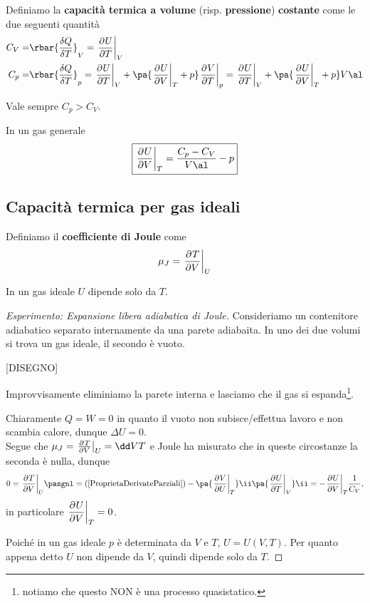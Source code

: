 \begin{definition}
Definiamo la \textbf{capacit\`a termica a volume} (risp. \textbf{pressione}) \textbf{costante} come le due seguenti quantit\`a
\begin{align*}
C_V=&\rbar{\frac{\delta Q}{\delta T}}_V=\ppb TUV\\
C_p=&\rbar{\frac{\delta Q}{\delta T}}_p=\ppb TUV +\pa{\ppb VUT+p}\ppb TVp=\ppb TUV +\pa{\ppb VUT+p}V\al
\end{align*} 
\end{definition}

\begin{remark}\label{DisguguaglianzaCapacitaTermiche}
Vale sempre $C_p>C_V$.
\end{remark}

\begin{remark}\label{DerivataEnergiaInternaRispettoAlVolume}
In un gas generale
\[\boxed{\ppb VUT=\frac{C_p-C_V}{V\al}-p}\]
\end{remark}

\subsection{Capacit\`a termica per gas ideali}

\begin{definition}
Definiamo il \textbf{coefficiente di Joule} come
\[\mu_J=\ppb VTU\]
\end{definition}

\begin{fact}\label{InGasIdealeUdipendeSoloDaT}
In un gas ideale $U$ dipende solo da $T$.
\end{fact}
\begin{proof}[Esperimento: Espansione libera adiabatica di Joule]
Consideriamo un contenitore adiabatico separato internamente da una parete adiabaita. In uno dei due volumi si trova un gas ideale, il secondo \`e vuoto.

[DISEGNO]

\noindent
Improvvisamente eliminiamo la parete interna e lasciamo che il gas si espanda\footnote{notiamo che questo NON \`e una processo quasistatico.}.\smallskip

\noindent
Chiaramente $Q=W=0$ in quanto il vuoto non subisce/effettua lavoro e non scambia calore, dunque $\Delta U=0$.\\
Segue che $\mu_J=\ppb VTU=\dd VT$ e Joule ha misurato che in queste circostanze la seconda \`e nulla, dunque
\[0=\ppb VTU\pasgnl={(\ref{ProprietaDerivateParziali})}-\pa{\ppb UVT}\ii\pa{\ppb TUV}\ii=-\ppb VUT\frac1{C_V},\]
in particolare $\displaystyle\ppb VUT=0$.\medskip

\noindent Poich\'e in un gas ideale $p$ \`e determinata da $V$ e $T$, $U=U(V,T)$. Per quanto appena detto $U$ non dipende da $V$, quindi dipende solo da $T$.
\end{proof}


